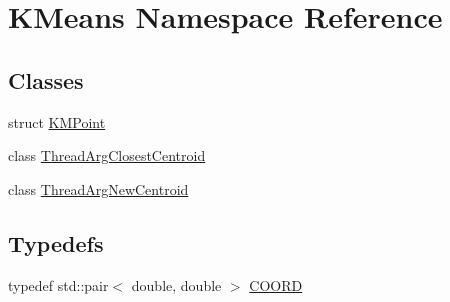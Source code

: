 \hypertarget{namespaceKMeans}{\section{K\-Means Namespace Reference}
\label{namespaceKMeans}
}
\subsection*{Classes}
\begin{DoxyCompactItemize}
\item 
struct \hyperlink{structKMeans_1_1KMPoint}{K\-M\-Point}
\item 
class \hyperlink{classKMeans_1_1ThreadArgClosestCentroid}{Thread\-Arg\-Closest\-Centroid}
\item 
class \hyperlink{classKMeans_1_1ThreadArgNewCentroid}{Thread\-Arg\-New\-Centroid}
\end{DoxyCompactItemize}
\subsection*{Typedefs}
\begin{DoxyCompactItemize}
\item 
typedef std\-::pair$<$ double, double $>$ \hyperlink{namespaceKMeans_a32ce08f4c8b30171faaeff5a3a466f30}{C\-O\-O\-R\-D}
\end{DoxyCompactItemize}

